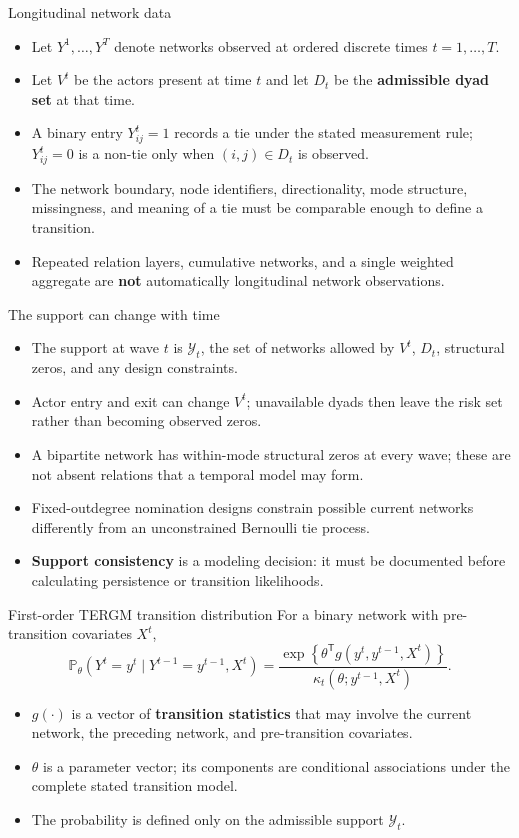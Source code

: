 \documentclass[aspectratio=169,11pt]{beamer}
\newcommand{\Prb}{\mathbb{P}}
\newcommand{\term}[1]{\textbf{\color{nupurple}#1}}
\begin{document}
\begin{frame}{Longitudinal network data}
\begin{itemize}
\item Let $Y^1,\ldots,Y^T$ denote networks observed at ordered discrete times $t=1,\ldots,T$.
\item Let $V^t$ be the actors present at time $t$ and let $D_t$ be the \term{admissible dyad set} at that time.
\item A binary entry $Y^t_{ij}=1$ records a tie under the stated measurement rule; $Y^t_{ij}=0$ is a non-tie only when $(i,j)\in D_t$ is observed.
\item The network boundary, node identifiers, directionality, mode structure, missingness, and meaning of a tie must be comparable enough to define a transition.
\item Repeated relation layers, cumulative networks, and a single weighted aggregate are \term{not} automatically longitudinal network observations.
\end{itemize}
\end{frame}

\begin{frame}{The support can change with time}
\begin{itemize}
\item The support at wave $t$ is $\mathcal{Y}_t$, the set of networks allowed by $V^t$, $D_t$, structural zeros, and any design constraints.
\item Actor entry and exit can change $V^t$; unavailable dyads then leave the risk set rather than becoming observed zeros.
\item A bipartite network has within-mode structural zeros at every wave; these are not absent relations that a temporal model may form.
\item Fixed-outdegree nomination designs constrain possible current networks differently from an unconstrained Bernoulli tie process.
\item \term{Support consistency} is a modeling decision: it must be documented before calculating persistence or transition likelihoods.
\end{itemize}
\end{frame}

\begin{frame}{First-order TERGM transition distribution}
For a binary network with pre-transition covariates $X^t$,
\[
\Prb_{\theta}\!\left(Y^t=y^t\mid Y^{t-1}=y^{t-1},X^t\right)
=
\frac{\exp\!\left\{\theta^{\mathsf T}g(y^t,y^{t-1},X^t)\right\}}
{\kappa_t(\theta;y^{t-1},X^t)}.
\]
\begin{itemize}
\item $g(\cdot)$ is a vector of \term{transition statistics} that may involve the current network, the preceding network, and pre-transition covariates.
\item $\theta$ is a parameter vector; its components are conditional associations under the complete stated transition model.
\item The probability is defined only on the admissible support $\mathcal{Y}_t$.
\end{itemize}
\end{frame}
\end{document}
